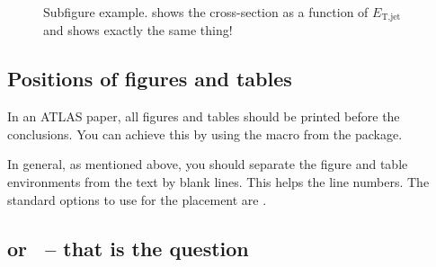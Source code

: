 \begin{figure}[htbp]
  \centering
  \caption{Subfigure example.
    \protect{} shows the cross-section as a function of $E_{\text{T,jet}}$ and 
    \protect{} shows exactly the same thing!}
  \label{fig:subfigexample}
\end{figure}


\subsection{Positions of figures and tables}

In an ATLAS paper, all figures and tables should be printed before the conclusions.
You can achieve this by using the macro  from the
 package.

In general, as mentioned above, you should separate the figure and table environments from the text by blank lines.
This helps the line numbers. The standard options to use for the placement are \Option{[htbp]}.


\subsection{\pT or \ET\ -- that is the question}

